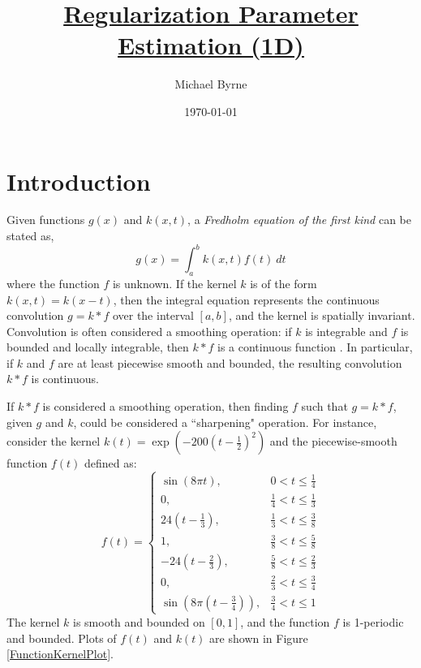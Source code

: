 \documentclass[12pt]{article}
\title{\underline{Regularization Parameter Estimation (1D)}}
\author{Michael Byrne}
\date{\today}
\newcommand{\gcon}{g}
\newcommand{\kcon}{k}
\newcommand{\fcon}{f}
\begin{document}
\maketitle

\section{Introduction} \label{Introduction}
Given functions $\gcon(x)$ and $\kcon(x,t)$, a \textit{Fredholm equation of the first kind} can be stated as,
\begin{equation}
	\gcon(x) = \int_a^b \kcon(x,t)\fcon(t)\:dt
	\label{Eq_Con}
\end{equation}
where the function $\fcon$ is unknown. If the kernel $\kcon$ is of the form $\kcon(x,t) = \kcon(x-t)$, then the integral equation represents the continuous convolution $\gcon = \kcon * \fcon$ over the interval $[a,b]$, and the kernel is spatially invariant. Convolution is often considered a smoothing operation: if $\kcon$ is integrable and $\fcon$ is bounded and locally integrable, then $\kcon * \fcon$ is a continuous function \cite{DebnathLokenath1999ItHs}. In particular, if $\kcon$ and $\fcon$ are at least piecewise smooth and bounded, the resulting convolution $\kcon * \fcon$ is continuous. \par
If $\kcon * \fcon$ is considered a smoothing operation, then finding $\fcon$ such that $\gcon = \kcon * \fcon$, given $\gcon$ and $\kcon$, could be considered a ``sharpening" operation. For instance, consider the kernel $\kcon(t) = \exp(-200(t-\frac{1}{2})^2)$ and the piecewise-smooth function $\fcon(t)$ defined as:
\begin{equation}
\fcon(t) = \begin{cases}
\sin\left(8\pi{t}\right), & 0 < t \leq \frac{1}{4} \\
0, & \frac{1}{4} < t \leq \frac{1}{3} \\
24\left(t-\frac{1}{3}\right), & \frac{1}{3} < t \leq \frac{3}{8} \\
1, & \frac{3}{8} < t \leq \frac{5}{8} \\
-24\left(t-\frac{2}{3}\right), & \frac{5}{8} < t \leq \frac{2}{3} \\
0, & \frac{2}{3} < t \leq \frac{3}{4} \\
\sin\left(8\pi\left(t-\frac{3}{4}\right)\right), & \frac{3}{4} < t \leq 1
\end{cases}
\label{Eq_TF2}
\end{equation}
The kernel $\kcon$ is smooth and bounded on $[0,1]$, and the function $\fcon$ is 1-periodic and bounded. Plots of $\fcon(t)$ and $\kcon(t)$ are shown in Figure \ref{FunctionKernelPlot}. \par
\end{document}
